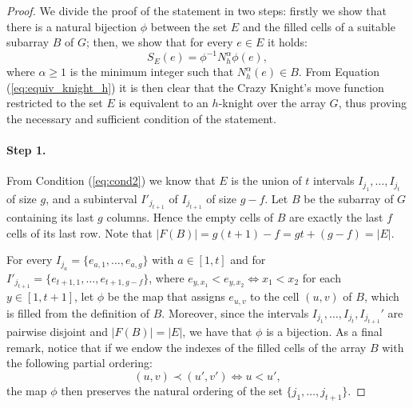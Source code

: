 \documentclass[10pt,a4paper]{amsart}
\begin{document}
\begin{proof}
We divide the proof of the statement in two steps:  firstly we show  that there is a natural bijection $\phi$ between the set $E$ and the filled cells of a suitable subarray $B$ of $G$; then, we show that for every $e \in E$ it holds:
\begin{equation}\label{eq:equiv_knight_h}
S_E(e) = \phi^{-1}N_h^\alpha\phi(e),
\end{equation}
where $\alpha\geq 1$ is the minimum integer such that $N_h^\alpha(e) \in B$. From Equation (\ref{eq:equiv_knight_h}) it is then clear that the Crazy Knight's move function restricted to the set $E$ is equivalent to an $h$-knight over the array $G$, thus proving the necessary and sufficient condition of the statement.

\paragraph{\textbf{Step 1.}} From Condition (\ref{eq:cond2}) we know that $E$ is the union of $t$ intervals $I_{j_1}, \dotsc, I_{j_t}$ of size $g$, and  a  subinterval $I'_{j_{t+1}} $ of $I_{j_{t+1}}$ of size $g-f$. Let $B $ be the subarray of $G$ containing its last $g$ columns. Hence the empty cells of $B$ are exactly the last $f$ cells of its last row. Note that $|F(B)|=g(t+1)-f=gt+(g-f)=|E|.$

For every $I_{j_a} = \{e_{a,1}, \dotsc, e_{a,g}\}$ with $a \in [1,t]$ and for $I'_{j_{t+1}} = \{e_{t+1,1},\dotsc, e_{t+1,g-f} \}$, where $e_{y,x_1}<e_{y,x_2} \Leftrightarrow x_1<x_2$ for each $y \in [1,t+1]$, let $\phi$ be the map that assigns $e_{u,v}$ to the cell $(u,v)$ of $B$, which is filled from the definition of $B$. Moreover, since the intervals $I_{j_1},\dotsc,I_{j_{t}},I_{j_{t+1}}'$ are pairwise disjoint and $|F(B)| = |E|$, we have that $\phi$ is a bijection. As a final remark, notice that if we endow the indexes of the filled cells of the array $B$ with the following partial ordering:
\[
(u,v) \prec (u',v') \Leftrightarrow u<u',
\]
 the map $\phi$ then preserves the natural ordering of the set $\{j_1, \dotsc, j_{t+1}\}$.


\end{proof}
\end{document}
